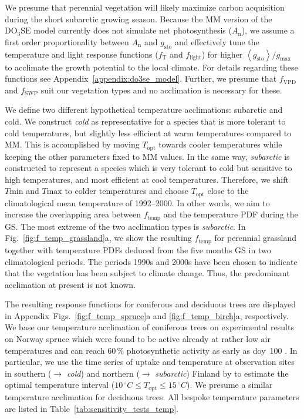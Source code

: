 \documentclass[bg, manuscript]{copernicus}
\begin{document}
We presume that perennial vegetation will likely maximize carbon acquisition during the short subarctic growing season. Because the MM version of the $\mathrm{DO_3SE}$ model currently does not simulate net photosynthesis ($A_\mathrm{n}$), we assume a first order proportionality between $A_\mathrm{n}$ and $g_\mathrm{sto}$ \citep{GCB:Medlyn2011} and effectively tune the temperature and light response functions ($f_\mathrm{T}$ and $f_\mathrm{light}$) for higher $\left<g_\mathrm{sto}\right>/g_\mathrm{max}$ to acclimate the growth potential to the local climate. For details regarding these functions see Appendix~\ref{appendix:do3se_model}. Further, we presume that $f_\mathrm{VPD}$ and $f_\mathrm{SWP}$ suit our vegetation types and no acclimation is necessary for these. 

We define two different hypothetical temperature acclimations: subarctic and cold. We construct \emph{cold} as representative for a species that is more tolerant to cold temperatures, but slightly less efficient at warm temperatures compared to MM. This is accomplished by moving $T_\mathrm{opt}$ towards cooler temperatures while keeping the other parameters fixed to MM values. In the same way, \emph{subarctic} is constructed to represent a species which is very tolerant to cold but sensitive to high temperatures, and most efficient at cool temperatures. Therefore, we shift $T\mathrm{min}$ and $T\mathrm{max}$ to colder temperatures and choose $T_\mathrm{opt}$ close to the climatological mean temperature of 1992--2000. In other words, we aim to increase the overlapping area between $f_\mathrm{temp}$ and the temperature PDF during the GS. The most extreme of the two acclimation types is \emph{subarctic}.
In Fig.~\ref{fig:f_temp_grassland}a, we show the resulting $f_\mathrm{temp}$ for perennial grassland together with temperature PDFs deduced from the five months GS in two climatological periods. The periods 1990s and 2000s have been chosen to indicate that the vegetation has been subject to climate change. Thus, the predominant acclimation at present is not known.

The resulting response functions for coniferous and deciduous trees are displayed in Appendix~Figs.~\ref{fig:f_temp_spruce}a and \ref{fig:f_temp_birch}a, respectively. We base our temperature acclimation of coniferous trees on experimental results on Norway spruce which were found to be active already at rather low air temperatures and can reach $60\,\unit{\%}$ photosynthetic activity as early as \unit{doy}~100 \citep{TB:Kolari2007, TP:Wallin2013}. In particular, we use the time series of  uptake and temperature at observation sites in southern ($\rightarrow$ \emph{cold}) and northern ($\rightarrow$ \emph{subarctic}) Finland by \citet{TB:Kolari2007} to estimate the optimal temperature interval ($10\,\unit{^\circ C}\le T_\mathrm{opt} \le 15\,\unit{^\circ C}$). We presume a similar temperature acclimation for deciduous trees. All bespoke temperature parameters are listed in Table~\ref{tab:sensitivity_tests_temp}.\\
\end{document}
